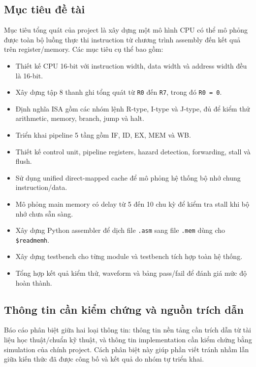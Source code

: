\documentclass[11pt,a4paper]{article}
\theoremstyle{definition}
\theoremstyle{remark}
\begin{document}
	\subsection{Mục tiêu đề tài}
	Mục tiêu tổng quát của project là xây dựng một mô hình CPU có thể mô phỏng được toàn bộ luồng thực thi instruction từ chương trình assembly đến kết quả trên register/memory. Các mục tiêu cụ thể bao gồm:
	\begin{itemize}
		\item Thiết kế CPU 16-bit với instruction width, data width và address width đều là 16-bit.
		\item Xây dựng tập 8 thanh ghi tổng quát từ \texttt{R0} đến \texttt{R7}, trong đó \texttt{R0 = 0}.
		\item Định nghĩa ISA gồm các nhóm lệnh R-type, I-type và J-type, đủ để kiểm thử arithmetic, memory, branch, jump và halt.
		\item Triển khai pipeline 5 tầng gồm IF, ID, EX, MEM và WB.
		\item Thiết kế control unit, pipeline registers, hazard detection, forwarding, stall và flush.
		\item Sử dụng unified direct-mapped cache để mô phỏng hệ thống bộ nhớ chung instruction/data.
		\item Mô phỏng main memory có delay từ 5 đến 10 chu kỳ để kiểm tra stall khi bộ nhớ chưa sẵn sàng.
		\item Xây dựng Python assembler để dịch file \texttt{.asm} sang file \texttt{.mem} dùng cho \texttt{\$readmemh}.
		\item Xây dựng testbench cho từng module và testbench tích hợp toàn hệ thống.
		\item Tổng hợp kết quả kiểm thử, waveform và bảng pass/fail để đánh giá mức độ hoàn thành.
	\end{itemize}
	
	\subsection{Thông tin cần kiểm chứng và nguồn trích dẫn}
	Báo cáo phân biệt giữa hai loại thông tin: thông tin nền tảng cần trích dẫn từ tài liệu học thuật/chuẩn kỹ thuật, và thông tin implementation cần kiểm chứng bằng simulation của chính project. Cách phân biệt này giúp phần viết tránh nhầm lẫn giữa kiến thức đã được công bố và kết quả do nhóm tự triển khai.
	
\end{document}
